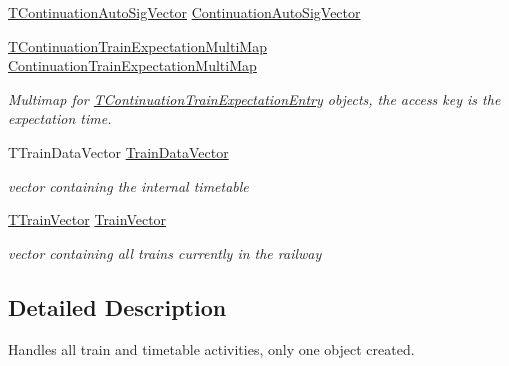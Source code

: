 \begin{DoxyCompactItemize}
\mbox{\hyperlink{class_t_train_controller_a1908f7d1a5dcfebf2f747efbdd6f4681}{T\+Continuation\+Auto\+Sig\+Vector}} \mbox{\hyperlink{class_t_train_controller_a0b412f7b88f829632e54bffc0659ac3b}{Continuation\+Auto\+Sig\+Vector}}
\item 
\mbox{\label{class_t_train_controller_a1a8e542193d93581e0c391d8e7fa3e1b}} 
\mbox{\hyperlink{class_t_train_controller_a36525478ab0d9f59e486b8c030acd87c}{T\+Continuation\+Train\+Expectation\+Multi\+Map}} \mbox{\hyperlink{class_t_train_controller_a1a8e542193d93581e0c391d8e7fa3e1b}{Continuation\+Train\+Expectation\+Multi\+Map}}
\begin{DoxyCompactList}\small\item\em Multimap for \mbox{\hyperlink{class_t_train_controller_1_1_t_continuation_train_expectation_entry}{T\+Continuation\+Train\+Expectation\+Entry}} objects, the access key is the expectation time. \end{DoxyCompactList}\item 
\mbox{\label{class_t_train_controller_a4e9c9e646d13f9b952434abcd97cec1b}} 
T\+Train\+Data\+Vector \mbox{\hyperlink{class_t_train_controller_a4e9c9e646d13f9b952434abcd97cec1b}{Train\+Data\+Vector}}
\begin{DoxyCompactList}\small\item\em vector containing the internal timetable \end{DoxyCompactList}\item 
\mbox{\label{class_t_train_controller_a694986ff09f8a037b8bce849e40ac119}} 
\mbox{\hyperlink{class_t_train_controller_aa9073b97736a2733dbdaf8dc52e34c24}{T\+Train\+Vector}} \mbox{\hyperlink{class_t_train_controller_a694986ff09f8a037b8bce849e40ac119}{Train\+Vector}}
\begin{DoxyCompactList}\small\item\em vector containing all trains currently in the railway \end{DoxyCompactList}\end{DoxyCompactItemize}


\subsection{Detailed Description}
Handles all train and timetable activities, only one object created. 

